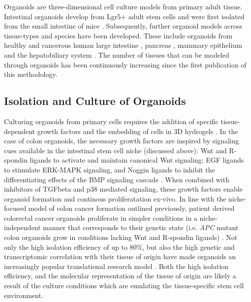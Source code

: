 \begin{flushleft}
Organoids are three-dimensional cell culture models from primary adult tissue. Intestinal organoids develop from Lgr5+ adult stem cells and were first isolated from the small intestine of mice \parencite{satoSingleLgr5Stem2009}. Subsequently, further organoid models across tissue-types and species have been developed. These include organoids from healthy and cancerous human large intestine \parencite{satoLongtermExpansionEpithelial2011}, pancreas \parencite{driehuisPancreaticCancerOrganoids2019}, mammary epithelium \parencite{zhangEstablishingEstrogenresponsiveMouse2017, sachsLivingBiobankBreast2018} and the hepatobiliary system \parencite{huchVitroExpansionSingle2013}. The number of tissues that can be modeled through organoids has been continuously increasing since the first publication of this methodology.

\subsection{Isolation and Culture of Organoids}

Culturing organoids from primary cells requires the addition of specific tissue-dependent growth factors and the embedding of cells in 3D hydrogels \parencite{merkerGastrointestinalOrganoidsHow2016}. In the case of colon organoids, the necessary growth factors are inspired by signaling cues available in the intestinal stem cell niche (discussed above): Wnt and R-spondin ligands to activate and maintain canonical Wnt signaling; EGF ligands to stimulate ERK-MAPK signaling, and Noggin ligands to inhibit the differentiating effects of the BMP signaling cascade \parencite{satoGrowingSelforganizingMiniguts2013}. When combined with inhibitors of TGFbeta and p38 mediated signaling, these growth factors enable organoid formation and continous proliferatation ex-vivo. In line with the niche-focused model of colon cancer formation outlined previously, patient derived colorectal cancer organoids proliferate in simpler conditions in a niche-independent manner that corresponds to their genetic state (i.e. \textit{APC} mutant colon organoids grow in conditions lacking Wnt and R-spondin ligands) \parencite{Fujii2016-ax}. Not only the high isolation efficiency of up to 80\%, but also the high genetic and transcriptomic correlation with their tissue of origin have made organoids an increasingly popular translational research model \parencite{pauliPersonalizedVitroVivo2017a}. Both the high isolation efficiency, and the molecular representation of the tissue of origin are likely a result of the culture conditions which are emulating the tissue-specific stem cell environment. \par


\end{flushleft}
